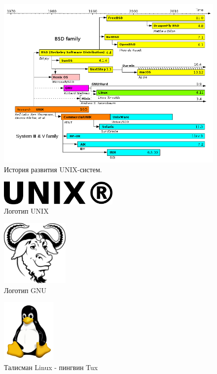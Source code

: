 \documentclass[bachelor, och, referat, times]{SCWorks}
\begin{document}
\begin{figure}[h]
    \centering
    \includegraphics[width=1\textwidth]{790px-Unix_timeline.png}
    \caption{История развития UNIX-систем.}
    \label{fig:hist}
\end{figure}

\begin{figure}[h]
    \centering
    \includegraphics[width=220px]{UNIX.png}
    \caption{Логотип UNIX}
    \label{fig:UNIX_symbol}
\end{figure}

\begin{figure}[h]
    \centering
    \includegraphics[width=125px]{128px-Heckert_GNU_white.png}
    \caption{Логотип GNU}
    \label{fig:GNU_symbol}
\end{figure}

\begin{figure}[t]
    \centering
    \includegraphics[width=100px]{Tux.png}
    \caption{Талисман Linux - пингвин Tux}
    \label{fig:linux_symbol}
\end{figure}
\end{document}
